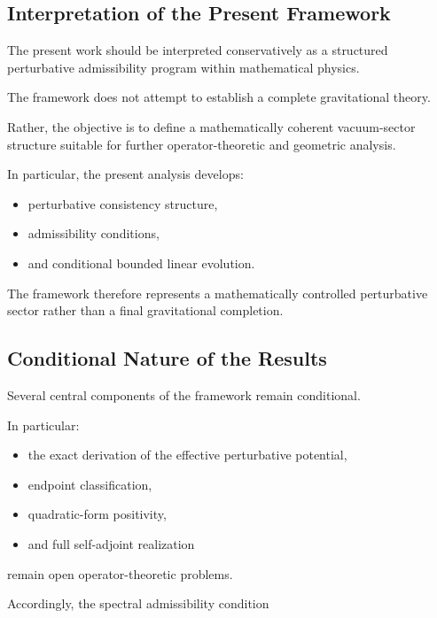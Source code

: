 
\subsection{Interpretation of the Present Framework}

The present work should be interpreted conservatively as a structured perturbative admissibility program within mathematical physics.

The framework does not attempt to establish a complete gravitational theory.

Rather, the objective is to define a mathematically coherent vacuum-sector structure suitable for further operator-theoretic and geometric analysis.

In particular, the present analysis develops:
\begin{itemize}[leftmargin=0.6cm]
\item perturbative consistency structure,
\item admissibility conditions,
\item and conditional bounded linear evolution.
\end{itemize}

The framework therefore represents a mathematically controlled perturbative sector rather than a final gravitational completion.


\subsection{Conditional Nature of the Results}

Several central components of the framework remain conditional.

In particular:
\begin{itemize}[leftmargin=0.6cm]
\item the exact derivation of the effective perturbative potential,
\item endpoint classification,
\item quadratic-form positivity,
\item and full self-adjoint realization
\end{itemize}

remain open operator-theoretic problems.

Accordingly, the spectral admissibility condition

